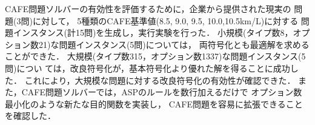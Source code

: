 CAFE問題ソルバーの有効性を評価するために，企業から提供された現実の
問題(3問)に対して，
5種類のCAFE基準値(8.5, 9.0, 9.5, 10.0,10.5km/L)に対する
問題インスタンス(計15問)を生成し，実行実験を行った．
%
小規模(タイプ数8，オプション数21)な問題インスタンス(5問)については，
両符号化とも最適解を求めることができた．
大規模(タイプ数315，オプション数1337)な問題インスタンス(5問)につい
ては，改良符号化が，基本符号化より優れた解を得ることに成功した．
これにより，大規模な問題に対する改良符号化の有効性が確認できた．
また，CAFE問題ソルバーでは，ASPのルールを数行加えるだけで
オプション数最小化のような新たな目的関数を実装し，
CAFE問題を容易に拡張できることを確認した．
